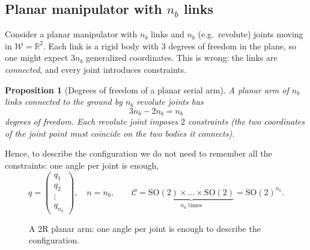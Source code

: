 \documentclass[11pt,a4paper]{article}
\newcommand{\R}{\mathbb{R}}
\newcommand{\W}{\mathcal{W}}
\newcommand{\C}{\mathcal{C}}
\newcommand{\SO}{\mathrm{SO}}
\theoremstyle{definition}
\theoremstyle{plain}
\newtheorem{proposition}[definition]{Proposition}
\begin{document}
\subsection{Planar manipulator with $n_b$ links}

Consider a planar manipulator with $n_b$ links and $n_b$ (e.g.\ revolute) joints moving in $\W=\R^2$. Each link is a rigid body with 3 degrees of freedom in the plane, so one might expect $3n_b$ generalized coordinates. This is wrong: the links are \emph{connected}, and every joint introduces constraints.

\begin{proposition}[Degrees of freedom of a planar serial arm]
A planar arm of $n_b$ links connected to the ground by $n_b$ revolute joints has
\[
  3n_b-2n_b=n_b
\]
degrees of freedom. Each revolute joint imposes $2$ constraints (the two coordinates of the joint point must coincide on the two bodies it connects).
\end{proposition}

Hence, to describe the configuration we do not need to remember all the constraints: one angle per joint is enough,
\[
  q=\begin{pmatrix}q_1\\q_2\\\vdots\\q_{n_b}\end{pmatrix},\quad n=n_b,\qquad
  \C=\underbrace{\SO(2)\times\dots\times\SO(2)}_{n_b\text{ times}}=\SO(2)^{n_b}.
\]

\begin{figure}[ht]
\centering
{}
\caption{A 2R planar arm: one angle per joint is enough to describe the configuration.}
\end{figure}
\end{document}
